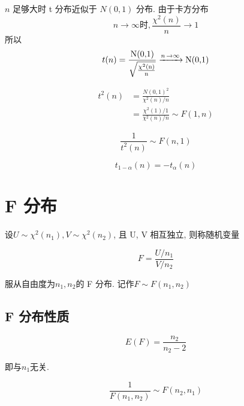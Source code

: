 \begin{corollary}
    $n$ 足够大时 t 分布近似于 $N(0,1)$ 分布. 由于卡方分布
    $$
        n\to \infty 时, \frac{\chi^2(n)}{n} \to 1
    $$
    所以
    $$
        \begin{aligned}
            t(n) =
            \ce{\frac{N(0,1)}{\sqrt{\frac{\chi^2(n)}{n}}}
            ->[n \to \infty]
            N(0,1)}
        \end{aligned}
    $$
\end{corollary}

\begin{corollary}[与 F 分布的关系]
    $$
        \begin{aligned}
            t^2(n) & = \frac{N(0,1)^2}{\chi^2 (n)/n}                    \\
                   & = \frac{\chi ^2(1)/1}{ \chi ^2(n) / n} \sim F(1,n)
        \end{aligned}
    $$

    $$
        \frac{1}{t^2(n)} \sim F(n,1)
    $$
\end{corollary}

\begin{definition}[t 分布的上分位点]
    $$
        t_{1-\alpha} (n) = -t_\alpha(n)
    $$
\end{definition}

\section{F 分布}

\begin{definition}[F 分布]
    设$U \sim \chi^2(n_1), V \sim \chi^2(n_2)$, 且 U, V 相互独立, 则称随机变量

    $$
        F = \frac{U/n_1}{V/n_2}
    $$

    服从自由度为$n_1,n_2$的 F 分布. 记作$F \sim F(n_1,n_2)$
\end{definition}

\subsection{F 分布性质}

\begin{corollary}[F 分布数学期望]
    $$
        E(F) =\frac{{ n_2} }{{ n_2}  - 2}
    $$

    即与$n_1$无关.
\end{corollary}

\begin{corollary}[$F(n_1,n_2),F(n_2,n_1)$的关系]
    $$
        \frac{1}{F(n_1,n_2)} \sim F(n_2,n_1)
    $$
\end{corollary}

